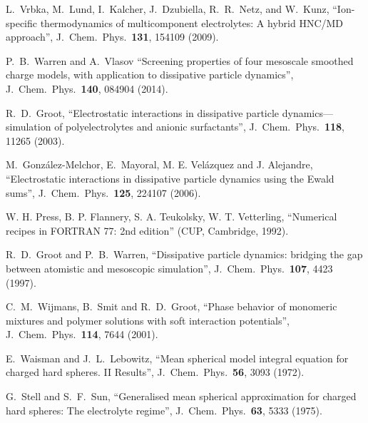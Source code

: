 \documentclass[12pt,a4paper]{article}
\begin{document}
 L.~Vrbka, M.~Lund, I.~Kalcher, J.~Dzubiella,
  R.~R.~Netz, and W.~Kunz, ``Ion-specific thermodynamics of
  multicomponent electrolytes: A hybrid HNC/MD approach'',
  J.\ Chem.\ Phys.\ {\bf131}, 154109 (2009).
  
 P.~B.~Warren and A.~Vlasov ``Screening properties of
  four mesoscale smoothed charge models, with application to
  dissipative particle dynamics'', J.\ Chem.\ Phys.\ {\bf140}, 084904
  (2014).

R.~D.~Groot, ``Electrostatic interactions in
  dissipative particle dynamics---simulation of polyelectrolytes and
  anionic surfactants'', J.\ Chem.\ Phys.\ {\bf118}, 11265 (2003).

M.~Gonz\'alez-Melchor, E.~Mayoral, M. E. Vel\'azquez
  and J. Alejandre, ``Electrostatic interactions in dissipative
  particle dynamics using the Ewald sums'', J.\ Chem.\ Phys.\ {\bf125},
  224107 (2006).

 W. H. Press, B. P. Flannery, S. A. Teukolsky,
  W. T. Vetterling, ``Numerical recipes in FORTRAN 77: 2nd edition''
  (CUP, Cambridge, 1992).

 R.~D.~Groot and P.~B.~Warren, ``Dissipative particle
  dynamics: bridging the gap between atomistic and mesoscopic
  simulation'', J.\ Chem.\ Phys.\ {\bf107}, 4423 (1997).

 C.~M.~Wijmans, B.~Smit and R.~D.~Groot, ``Phase
  behavior of monomeric mixtures and polymer solutions with soft
  interaction potentials'', J.\ Chem.\ Phys.\ {\bf114}, 7644 (2001).

 E.~Waisman and J.~L.~Lebowitz, ``Mean spherical model
  integral equation for charged hard spheres. II Results'',
  J.\ Chem.\ Phys.\ {\bf56}, 3093 (1972).

 G.~Stell and S.~F.~Sun, ``Generalised mean spherical
  approximation for charged hard spheres: The electrolyte regime'',
  J.\ Chem.\ Phys.\ {\bf63}, 5333 (1975).
\end{document}
